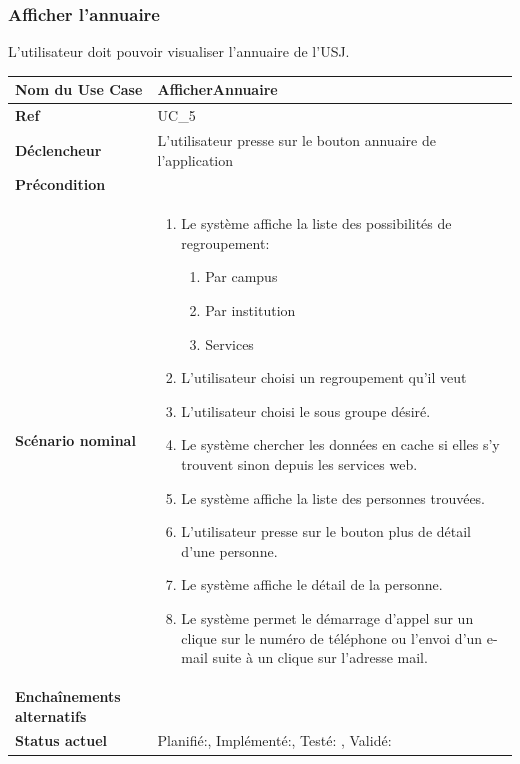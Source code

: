 			\subsubsection{Afficher l'annuaire}
					L'utilisateur doit pouvoir visualiser l'annuaire de l'USJ.\\[0.2cm]
					\begin{longtable}{|l|p{10cm}|}
						\hline \textbf{Nom du Use Case} & AfficherAnnuaire \\ 
						\hline \textbf{Ref} & UC\_5  \\ 
						\hline \textbf{Déclencheur} & L'utilisateur presse sur le bouton annuaire  de l'application \\
						\hline \textbf{Précondition} &  \\
						\hline \textbf{Scénario nominal} & 
						\begin{enumerate}
							\item Le système affiche la liste des possibilités de regroupement:
								\begin{enumerate}
									\item Par campus
									\item Par institution
									\item Services
								\end{enumerate}
							\item L'utilisateur choisi un regroupement qu'il veut
							\item L'utilisateur choisi le sous groupe désiré.
							\item Le système chercher les données en cache si elles s'y trouvent sinon depuis les services web.
							\item Le système affiche la liste des personnes trouvées.
							\item L'utilisateur presse sur le bouton plus de détail d'une personne.
							\item Le système affiche le détail de la personne.
							\item Le système permet le démarrage d'appel sur un clique sur le numéro de téléphone ou l'envoi d'un e-mail suite à un clique sur l'adresse mail.
						\end{enumerate}
						\\ 
						\hline \textbf{Enchaînements alternatifs} & \\
						\hline \textbf{Status actuel} & Planifié:\CheckedBox , Implémenté:\CheckedBox  , Testé: \CheckedBox  , Validé: \CheckedBox  \\
						\hline 
					\end{longtable} 
